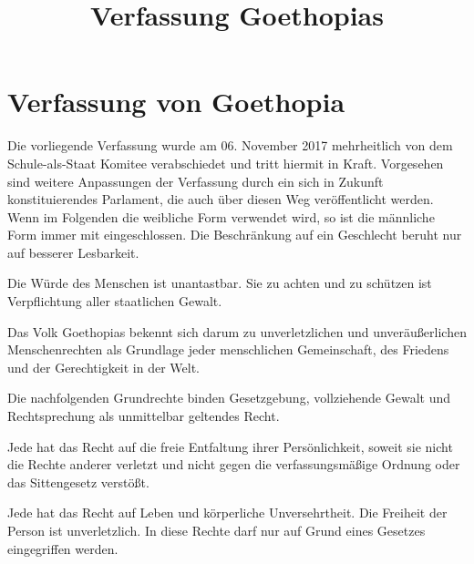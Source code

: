 \documentclass{sasbase}
\begin{document}
\title{Verfassung Goethopias}

\setcounter{secnumdepth}{5}

\mytitle

\parensstyle

\section{Verfassung von Goethopia}


Die vorliegende Verfassung wurde am 06. November 2017 mehrheitlich von dem Schule-als-Staat Komitee verabschiedet und tritt hiermit in Kraft. Vorgesehen sind weitere Anpassungen der Verfassung durch ein sich in Zukunft konstituierendes Parlament, die auch \"{u}ber diesen Weg ver\"{o}ffentlicht werden.\\
\indent Wenn im Folgenden die weibliche Form verwendet wird, so ist die männliche Form immer mit eingeschlossen. Die Beschränkung auf ein Geschlecht beruht nur auf besserer Lesbarkeit.


\begin{article}
	\item Die Würde des Menschen ist unantastbar. Sie zu achten und zu schützen ist Verpflichtung aller staatlichen Gewalt.
 	\item Das Volk Goethopias bekennt sich darum zu unverletzlichen und unveräußerlichen Menschenrechten als Grundlage jeder menschlichen Gemeinschaft, des Friedens und der Gerechtigkeit in der Welt.
	\item Die nachfolgenden Grundrechte binden Gesetzgebung, vollziehende Gewalt und Rechtsprechung als unmittelbar geltendes Recht.
\end{article}

\begin{article}
	\item Jede hat das Recht auf die freie Entfaltung ihrer Persönlichkeit, soweit sie nicht die Rechte anderer verletzt und nicht gegen die verfassungsmäßige Ordnung oder das Sittengesetz verstößt.	
	\item Jede hat das Recht auf Leben und körperliche Unversehrtheit. Die Freiheit der Person ist unverletzlich. In diese Rechte darf nur auf Grund eines Gesetzes eingegriffen werden.
\end{article}
\end{document}
